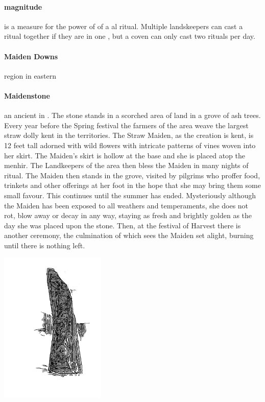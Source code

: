 \paragraph{magnitude} is a measure for the power of of a al ritual. Multiple landskeepers can cast a ritual together if they are in one , but a coven can only cast two rituals per day.
\paragraph{Maiden Downs} region in eastern 
\paragraph{Maidenstone} an ancient  in . The stone stands in a scorched area of land in a grove of ash trees. Every year before the Spring festival the farmers of the area weave the largest straw dolly kent in the territories. The Straw Maiden, as the creation is kent, is 12 feet tall adorned with wild flowers with intricate patterns of vines woven into her skirt. The Maiden’s skirt is hollow at the base and she is placed atop the menhir. The Landkeepers of the area then bless the Maiden in many nights of ritual. The Maiden then stands in the grove, visited by pilgrims who proffer food, trinkets and other offerings at her foot in the hope that she may bring them some small favour. This continues until the summer has ended. Mysteriously although the Maiden has been exposed to all weathers and temperaments, she does not rot, blow away or decay in any way, staying as fresh and brightly golden as the day she was placed upon the stone. Then, at the festival of Harvest there is another ceremony, the culmination of which sees the Maiden set alight, burning until there is nothing left.  \begin{center}\includegraphics[width=5cm]{encyclopedia/Maidenstone} \end{center}
